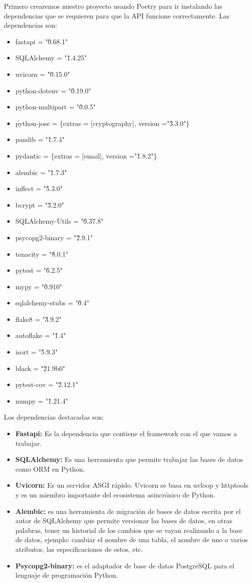 Primero crearemos nuestro proyecto usando Poetry para ir instalando las dependencias que se requieren para que la API funcione correctamente. Las dependencias son: 
\begin{itemize}
    \item fastapi = "\^0.68.1"
    \item SQLAlchemy = "\^1.4.25"
    \item uvicorn = "\^0.15.0"
    \item python-dotenv = "\^0.19.0"
    \item python-multipart = "\^0.0.5"
    \item python-jose = \{extras = [cryptography], version ="\^3.3.0"\}
    \item passlib = "\^1.7.4"
    \item pydantic = \{extras = [email], version ="\^1.8.2"\}
    \item alembic = "\^1.7.3"
    \item inflect = "\^5.3.0"
    \item bcrypt = "\^3.2.0"
    \item SQLAlchemy-Utils = "\^0.37.8"
    \item psycopg2-binary = "\^2.9.1"
    \item tenacity = "\^8.0.1"
    \item pytest = "\^6.2.5"
    \item mypy = "\^0.910"
    \item sqlalchemy-stubs = "\^0.4"
    \item flake8 = "\^3.9.2"
    \item autoflake = "\^1.4"
    \item isort = "\^5.9.3"
    \item black = "\^21.9b0"
    \item pytest-cov = "\^2.12.1"
    \item numpy = "\^1.21.4"
\end{itemize}

Los dependencias destacadas son: 
\begin{itemize}
    \item \textbf{Fastapi: }Es la dependencia que contiene el framework con el que vamos a trabajar.
    \item \textbf{SQLAlchemy: }Es una herramienta que permite trabajar las bases de datos como \gls{ORM} en Python.
    \item \textbf{Uvicorn: }Es un servidor ASGI rápido. Uvicorn se basa en uvloop y httptools y es un miembro importante del ecosistema asincrónico de Python.
    \item \textbf{Alembic: }es una herramienta de migración de bases de datos escrita por el autor de SQLAlchemy que permite versionar las bases de datos, en otras palabras, tener un historial de los cambios que se vayan realizando a la base de datos, ejemplo: cambiar el nombre de una tabla, el nombre de uno o varios atributos, las especificaciones de estos, etc.
    \item \textbf{Psycopg2-binary: }es el adaptador de base de datos PostgreSQL para el lenguaje de programación Python.
\end{itemize}

